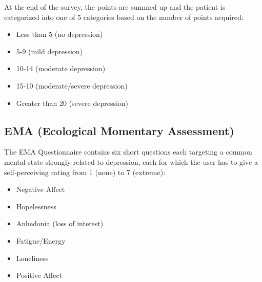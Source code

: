 At the end of the survey, the points are summed up and the patient is categorized into one of 5 categories based on the number of points acquired:

\begin{itemize}
\item Less than 5 (no depression)
\item 5-9 (mild depression)
\item 10-14 (moderate depression)
\item 15-10 (moderate/severe depression)
\item Greater than 20 (severe depression)
\end{itemize}


\subsection{EMA (Ecological Momentary Assessment)}
The EMA Questionnaire contains six short questions each targeting a common mental state strongly related to depression, each for which the user has to give a self-perceiving rating from 1 (none) to 7 (extreme):

\begin{itemize}
\item Negative Affect
\item Hopelessness
\item Anhedonia (loss of interest)
\item Fatigue/Energy
\item Loneliness
\item Positive Affect
\end{itemize}